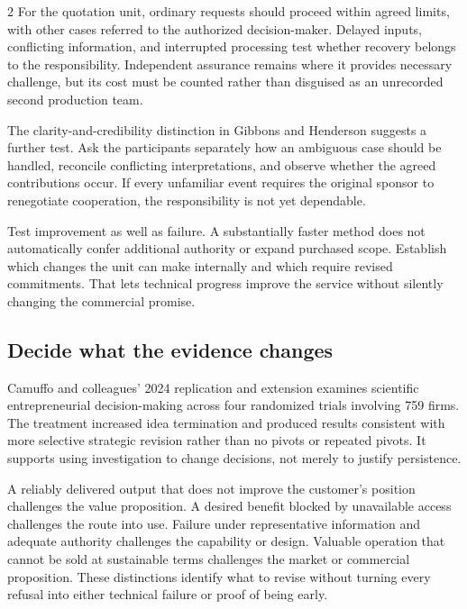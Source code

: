 \begin{multicols}{2}
For the quotation unit, ordinary requests should proceed within agreed
limits, with other cases referred to the authorized decision-maker.
Delayed inputs, conflicting information, and interrupted processing test
whether recovery belongs to the responsibility. Independent assurance
remains where it provides necessary challenge, but its cost must be
counted rather than disguised as an unrecorded second production team.

The clarity-and-credibility distinction in Gibbons and Henderson
\citep{gibbons2012contracts} suggests a further test. Ask the
participants separately how an ambiguous case should be handled,
reconcile conflicting interpretations, and observe whether the agreed
contributions occur. If every unfamiliar event requires the original
sponsor to renegotiate cooperation, the responsibility is not yet
dependable.

Test improvement as well as failure. A substantially faster method does
not automatically confer additional authority or expand purchased scope.
Establish which changes the unit can make internally and which require
revised commitments. That lets technical progress improve the service
without silently changing the commercial promise.

\subsection{Decide what the evidence
changes}\label{decide-what-the-evidence-changes}

Camuffo and colleagues' 2024 replication and extension
\citep{camuffo2024scientific} examines scientific entrepreneurial
decision-making across four randomized trials involving 759 firms. The
treatment increased idea termination and produced results consistent
with more selective strategic revision rather than no pivots or repeated
pivots. It supports using investigation to change decisions, not merely
to justify persistence.

A reliably delivered output that does not improve the customer's
position challenges the value proposition. A desired benefit blocked by
unavailable access challenges the route into use. Failure under
representative information and adequate authority challenges the
capability or design. Valuable operation that cannot be sold at
sustainable terms challenges the market or commercial proposition. These
distinctions identify what to revise without turning every refusal into
either technical failure or proof of being early.


\end{multicols}
